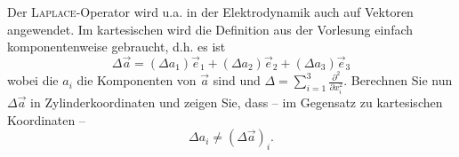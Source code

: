 \begin{atiTask}[
  title = Laplaceoperator in 3 Dimensionen
]

Der \textsc{Laplace}-Operator wird u.a. in der Elektrodynamik auch auf Vektoren angewendet. Im kartesischen wird die Definition aus der Vorlesung einfach komponentenweise gebraucht, d.h. es ist
\[
\Delta\vec{a}=(\Delta a_1)\vec{e}_1+(\Delta a_2)\vec{e}_2+(\Delta a_3)\vec{e}_3
\]
wobei die $a_i$ die Komponenten von $\vec{a}$ sind und $\Delta=\sum_{i=1}^3\frac{\partial^2}{\partial x_i^2}$.
Berechnen Sie nun $\Delta \vec{a}$ in Zylinderkoordinaten und zeigen Sie, dass -- im Gegensatz zu kartesischen Koordinaten -- 
\[
\Delta a_i\neq (\Delta \vec{a})_i.
\]


\end{atiTask}

\begin{atiSolution}
	
\end{atiSolution}